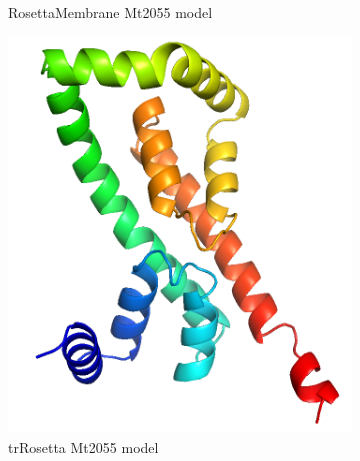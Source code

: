 \begin{figure}[htb]
\begin{subfigure}{0.25\textwidth}
  \caption{RosettaMembrane Mt2055 model}
  \label{fig:w9_rosM}
\end{subfigure}
\begin{subfigure}{0.25\textwidth}
  \includegraphics[width=\linewidth]{Results/w9_tr.png}
  \caption{trRosetta Mt2055 model}
  \label{fig:w9_tr}
\end{subfigure}\hfil %
\begin{subfigure}{0.25\textwidth}

\end{subfigure}
\end{figure}
